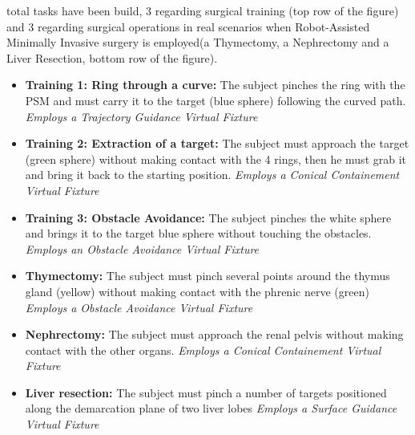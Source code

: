 \documentclass{article}
\begin{document}
\newpage
{} total tasks have been build, 3 regarding surgical training (top row of the figure) and 3 regarding surgical operations in real scenarios when Robot-Assisted Minimally Invasive surgery is employed(a Thymectomy, a Nephrectomy and a Liver Resection, bottom row of the figure).
\begin{itemize}
    \item \textbf{Training 1: Ring through a curve:} The subject pinches the ring with the PSM and must carry it to the target (blue sphere) following the curved path.\newline
    \phantom{.....}\textit{Employs a Trajectory Guidance Virtual Fixture}

    \item \textbf{Training 2: Extraction of a target:} The subject must approach the target (green sphere) without making contact with the 4 rings, then he must grab it and bring it back to the starting position. \newline
    \phantom{.....}\textit{Employs a Conical Containement Virtual Fixture}

    \item \textbf{Training 3: Obstacle Avoidance:} The subject pinches the white sphere and brings it to the target blue sphere without touching the obstacles. \newline
    \phantom{.....}\textit{Employs an Obstacle Avoidance Virtual Fixture}

    \item \textbf{Thymectomy:} The subject must pinch several points around the thymus gland (yellow) without making contact with the phrenic nerve (green)\newline
    \phantom{.....}\textit{Employs a Obstacle Avoidance Virtual Fixture}

    \item \textbf{Nephrectomy:} The subject must approach the renal pelvis without making contact with the other organs.\newline
    \phantom{.....}\textit{Employs a Conical Containement Virtual Fixture}

    \item \textbf{Liver resection:} The subject must pinch a number of targets positioned along the demarcation plane of two liver lobes\newline
    \phantom{.....}\textit{Employs a Surface Guidance Virtual Fixture}
\end{itemize}
    
\end{document}
